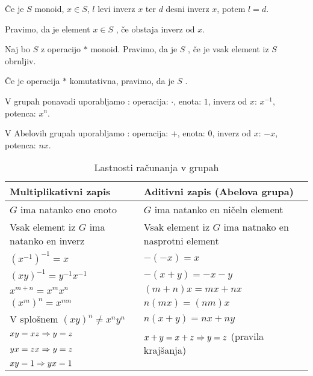 \begin{trditev}
    Če je $S$ monoid, $x \in S$, $l$ levi inverz $x$ ter $d$ desni inverz $x$, potem $l=d$.
\end{trditev}

\begin{definicija}
    Pravimo, da je element $x \in S$ , če obstaja inverz od $x$.
\end{definicija}

\begin{definicija}
    Naj bo $S$ z operacijo $*$ monoid. Pravimo, da je $S$ , če je vsak element iz $S$ obrnljiv.

    Če je operacija $*$ komutativna, pravimo, da je $S$ .
\end{definicija}

V grupah ponavadi uporabljamo : operacija: $\cdot$, enota: $1$, inverz od $x$: $x^{-1}$, potenca: $x^n$.

V Abelovih grupah uporabljamo : operacija: $+$, enota: $0$, inverz od $x$: $-x$, potenca: $nx$.

\begin{table}[h!]
    \begin{tabular}{ m{23em} | m{23em} }
        Multiplikativni zapis & Aditivni zapis (Abelova grupa) \\ \hline
        $G$ ima natanko eno enoto & $G$ ima natanko en ničeln element \\ \hline
        Vsak element iz $G$ ima natanko en inverz & Vsak element iz $G$ ima natnako en nasprotni element  \\  \hline
        $(x^{-1})^{-1} = x$ & $-(-x) = x$ \\ \hline
        $(xy)^{-1} = y^{-1}x^{-1}$ & $-(x+y) = -x - y$ \\ \hline
        $x^{m+n} = x^mx^n$ & $(m+n)x = mx + nx$ \\ \hline
        $(x^m)^n = x^{mn}$ & $n(mx) = (nm)x$ \\ \hline
        V splošnem $(xy)^n \neq x^ny^n$ & $n(x+y) = nx + ny$ \\ \hline
        $xy=xz \Rightarrow y=z$ & \multirow{2}{20em}{$x+y = x + z \Rightarrow y = z$ (pravila krajšanja)} \\ 
        $yx=zx \Rightarrow y=z$ & \\ \hline
        $xy=1 \Rightarrow yx =1$ & \\
    \end{tabular}
    \caption{Lastnosti računanja v grupah}
\end{table}

